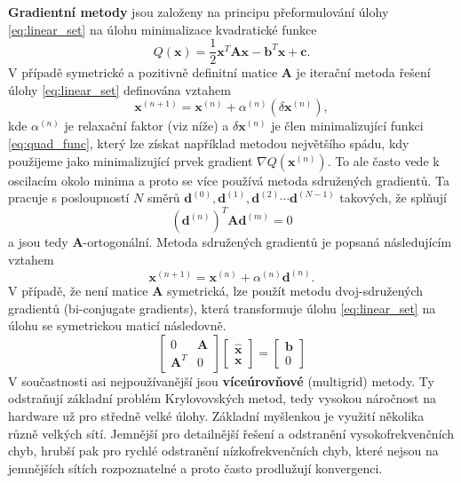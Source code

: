 \documentclass[a4paper,12pt]{report}
\theoremstyle{remark}
\begin{document}
\textbf{Gradientní metody} jsou založeny na principu přeformulování úlohy \eqref{eq:linear_set} na úlohu  minimalizace kvadratické funkce
\begin{equation}
	Q(\boldsymbol{x}) = \frac{1}{2} \boldsymbol{x}^T \boldsymbol{A} \boldsymbol{x}-\boldsymbol{b}^T \boldsymbol{x} + \boldsymbol{c}.
	\label{eq:quad_func}
\end{equation}
V případě symetrické a pozitivně definitní matice $\boldsymbol{A}$ je iterační metoda řešení úlohy \eqref{eq:linear_set} definována vztahem
\begin{equation}
	\boldsymbol{x}^{(n+1)} = \boldsymbol{x}^{(n)} + \alpha^{(n)} \left( \delta \boldsymbol{x}^{(n)} \right),
	\label{eq:grad_iter}
\end{equation}
kde $\alpha^{(n)}$ je relaxační faktor (viz níže) a $\delta \boldsymbol{x}^{(n)}$ je člen minimalizující funkci \eqref{eq:quad_func}, který lze získat například metodou největšího spádu, kdy použijeme jako minimalizující prvek gradient $\nabla Q(\boldsymbol{x}^{(n)})$. To ale často vede k oscilacím okolo minima a proto se více používá metoda sdružených gradientů. Ta pracuje s posloupností $N$ směrů  $\boldsymbol{d}^{(0)}, \boldsymbol{d}^{(1)}, \boldsymbol{d}^{(2)} \cdots \boldsymbol{d}^{(N-1)}$ takových, že splňují
\begin{equation*}
	\left(\boldsymbol{d}^{(n)}\right)^T\boldsymbol{A} \boldsymbol{d}^{(m)} = 0
\end{equation*}
a jsou tedy $\boldsymbol{A}$-ortogonální. Metoda sdružených gradientů je popsaná následujícím vztahem
\begin{equation*}
	\boldsymbol{x}^{(n+1)} = \boldsymbol{x}^{(n)} + \alpha^{(n)} \boldsymbol{d}^{(n)}.
	\label{eq:grad_cg}
\end{equation*}
V případě, že není matice $\boldsymbol{A}$ symetrická, lze použít metodu dvoj-sdružených gradientů (bi-conjugate gradients), která transformuje úlohu \eqref{eq:linear_set} na úlohu se symetrickou maticí následovně.
\begin{equation}
	\begin{bmatrix}
		0 & \boldsymbol{A}\\
		\boldsymbol{A}^T & 0
	\end{bmatrix}
	\begin{bmatrix}
		\hat{\boldsymbol{x}}\\
		\boldsymbol{x}
	\end{bmatrix} =
	\begin{bmatrix}
		\boldsymbol{b}\\
		0
	\end{bmatrix}
\end{equation}
V součastnosti asi nejpoužívanější jsou \textbf{víceúrovňové} (multigrid) metody. Ty odstraňují základní problém Krylovovských metod, tedy vysokou náročnost na hardware už pro středně velké úlohy. Základní myšlenkou je využití několika různě velkých sítí. Jemnější pro detailnější řešení a odstranění vysokofrekvenčních chyb, hrubší pak pro rychlé odstranění nízkofrekvenčních chyb, které nejsou na jemnějších sítích rozpoznatelné a proto často prodlužují konvergenci. 
\end{document}
